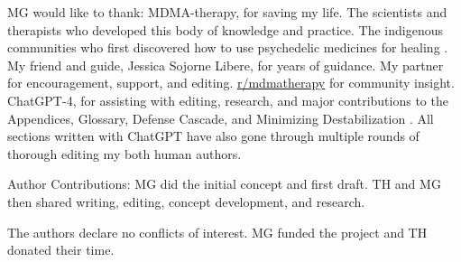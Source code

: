 \documentclass[12pt,letterpaper]{article}
\begin{document}
MG would like to thank: MDMA-therapy, for saving my life. The scientists and therapists who developed this body of knowledge and practice. The indigenous communities who first discovered how to use psychedelic medicines for healing \cite{davisOneRiver}. My friend and guide, Jessica Sojorne Libere, for years of guidance. My partner for encouragement, support, and editing. \href{https://www.reddit.com/r/mdmatherapy}{r/mdmatherapy} for community insight. ChatGPT-4, for assisting with editing, research, and major contributions to the Appendices, Glossary, Defense Cascade, and Minimizing Destabilization \cite{openaiGPT}. All sections written with ChatGPT have also gone through multiple rounds of thorough editing my both human authors.


Author Contributions: MG did the initial concept and first draft. TH and MG then shared writing, editing, concept development, and research.

The authors declare no conflicts of interest. MG funded the project and TH donated their time.
\end{document}
